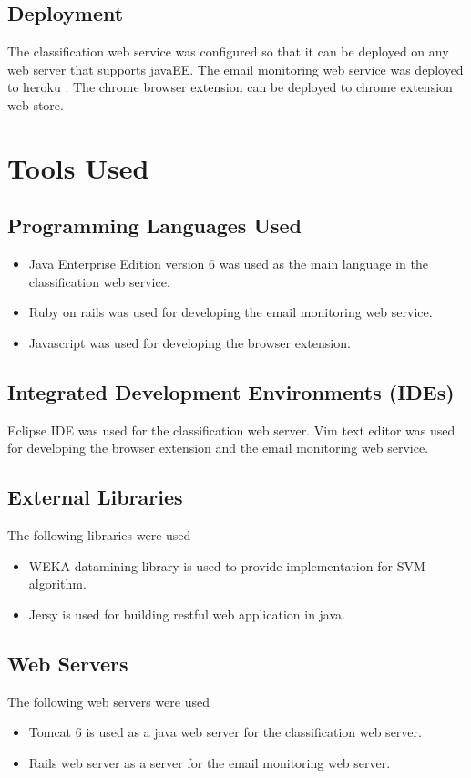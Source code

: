 \subsection{Deployment}
The classification web service was configured so that it can be deployed on any 
web server that supports javaEE. The email monitoring web service was deployed 
to heroku \cite{HEROKU}. The chrome browser extension can be deployed to chrome 
extension web store.

\section{Tools Used}
\label{sec:5_tools_used}

\subsection{Programming Languages Used}
\begin{itemize}
  \item Java Enterprise Edition version 6 was used as the main language in the 
  classification web service.
  \item Ruby on rails \cite{ROR} was used for developing the email monitoring 
  web service.
  \item Javascript was used for developing the browser extension.
\end{itemize}

\subsection{Integrated Development Environments (IDEs)}
Eclipse IDE was used for the classification web server.
Vim text editor was used for developing the browser extension and the email 
monitoring web service.

\subsection{External Libraries}
The following libraries were used
\begin{itemize}
  \item WEKA \cite{WEKA} datamining library is used to provide implementation for SVM algorithm.
  \item Jersy \cite{JERSY} is used for building restful web application in java.
\end{itemize}


\subsection{Web Servers}
The following web servers were used
\begin{itemize}
  \item Tomcat 6 is used as a java web server for the classification web server.
  \item Rails web server as a server for the email monitoring web server.
\end{itemize}

